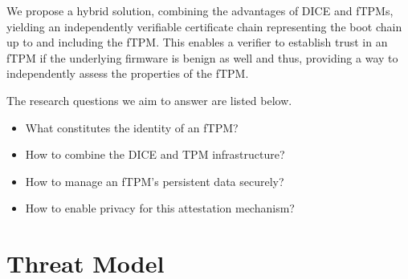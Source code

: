 
We propose a hybrid solution, combining the advantages of \ac{DICE} and \acp{fTPM}, yielding an independently verifiable certificate chain representing the boot chain up to and including the \ac{fTPM}.
This enables a verifier to establish trust in an \ac{fTPM} if the underlying firmware is benign as well and thus, providing a way to independently assess the properties of the \ac{fTPM}.


The research questions we aim to answer are listed below.
\begin{itemize}
  \item What constitutes the identity of an fTPM\@? %
  \item How to combine the DICE and TPM infrastructure? %
  \item How to manage an fTPM's persistent data securely? %
  \item How to enable privacy for this attestation mechanism?
\end{itemize}



\section{Threat Model}



